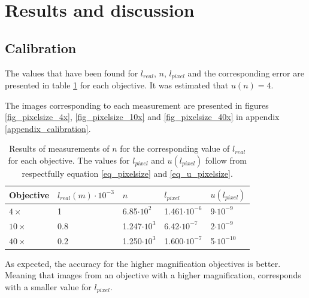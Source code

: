 \section{Results and discussion}

\subsection{Calibration}

The values that have been found for $l_{real}$, $n$, $l_{pixel}$ and the corresponding error are presented in table \ref{table_pixelsize} for each objective. It was estimated that $u(n) = 4$.

The images corresponding to each measurement are presented in figures \ref{fig_pixelsize_4x}, \ref{fig_pixelsize_10x} and \ref{fig_pixelsize_40x} in appendix \ref{appendix_calibration}.

\begin{table}[h!]


\centering
\captionsetup{font=small, justification = centering}
  \caption{Results of measurements of $n$ for the corresponding value of $l_{real}$ for each objective. The values for $l_{pixel}$ and $u(l_{pixel})$ follow from respectfully equation \ref{eq_pixelsize} and \ref{eq_u_pixelsize}.}

\begin{tabular}{|l|l|l|l|l|}
\hline

Objective & $l_{real} (m) \cdot 10^{-3}$ & $n$ & $l_{pixel}$ & $u(l_{pixel})$ \\ \hline
$4\times$ & 1 & 6.85$\cdot 10^2$ & 1.461$\cdot 10^{-6}$ & 9$\cdot 10^{-9}$\\
$10\times$ & 0.8 & 1.247$\cdot 10^3$ & 6.42$\cdot 10^{-7}$ & 2$\cdot 10^{-9}$ \\
$40\times$ & 0.2 & 1.250$\cdot 10^3$ & 1.600$\cdot 10^{-7}$ & 5$\cdot 10^{-10}$ \\ \hline
\end{tabular}

\label{table_pixelsize}
\end{table}

As expected, the accuracy for the higher magnification objectives is better. Meaning that images from an objective with a higher magnification, corresponds with a smaller value for $l_{pixel}$. 

\bigskip

